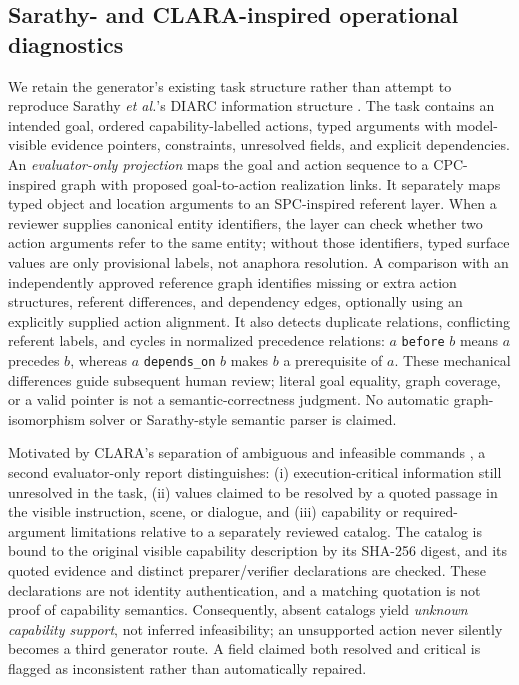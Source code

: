 \documentclass[10pt,conference]{IEEEtran}
\begin{document}
\subsection{Sarathy- and CLARA-inspired operational diagnostics}
We retain the generator's existing task structure rather than attempt to reproduce Sarathy \emph{et al.}'s DIARC information structure \cite{sarathy}. The task contains an intended goal, ordered capability-labelled actions, typed arguments with model-visible evidence pointers, constraints, unresolved fields, and explicit dependencies. An \emph{evaluator-only projection} maps the goal and action sequence to a CPC-inspired graph with proposed goal-to-action realization links. It separately maps typed object and location arguments to an SPC-inspired referent layer. When a reviewer supplies canonical entity identifiers, the layer can check whether two action arguments refer to the same entity; without those identifiers, typed surface values are only provisional labels, not anaphora resolution. A comparison with an independently approved reference graph identifies missing or extra action structures, referent differences, and dependency edges, optionally using an explicitly supplied action alignment. It also detects duplicate relations, conflicting referent labels, and cycles in normalized precedence relations: $a$ \texttt{before} $b$ means $a$ precedes $b$, whereas $a$ \texttt{depends\_on} $b$ makes $b$ a prerequisite of $a$. These mechanical differences guide subsequent human review; literal goal equality, graph coverage, or a valid pointer is not a semantic-correctness judgment. No automatic graph-isomorphism solver or Sarathy-style semantic parser is claimed.

Motivated by CLARA's separation of ambiguous and infeasible commands \cite{clara}, a second evaluator-only report distinguishes: (i) execution-critical information still unresolved in the task, (ii) values claimed to be resolved by a quoted passage in the visible instruction, scene, or dialogue, and (iii) capability or required-argument limitations relative to a separately reviewed catalog. The catalog is bound to the original visible capability description by its SHA-256 digest, and its quoted evidence and distinct preparer/verifier declarations are checked. These declarations are not identity authentication, and a matching quotation is not proof of capability semantics. Consequently, absent catalogs yield \emph{unknown capability support}, not inferred infeasibility; an unsupported action never silently becomes a third generator route. A field claimed both resolved and critical is flagged as inconsistent rather than automatically repaired.
\end{document}
